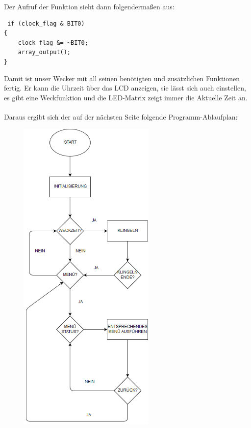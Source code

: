 \documentclass[openright,twoside,11pt,a4paper]{scrartcl}
\begin{document}
\begin{flushleft}
\newpage
Der Aufruf der Funktion sieht dann folgendermaßen aus:
	 	\begin{lstlisting}
 if (clock_flag & BIT0)
{
	clock_flag &= ~BIT0;
	array_output();
}
	 	\end{lstlisting}
	 	Damit ist unser Wecker mit all seinen benötigten und zusätzlichen Funktionen fertig. Er kann die Uhrzeit über das LCD anzeigen, sie lässt sich auch einstellen, es gibt eine Weckfunktion und die LED-Matrix zeigt immer die Aktuelle Zeit an.\\
	 	\ \\
	 	Daraus ergibt sich der auf der nächsten Seite folgende Programm-Ablaufplan:
	 	\begin{figure}[htbp] 
	 		\centering
	 		\includegraphics[width=0.6\textwidth]{Untitled Diagram.png}
	 		\label{fig:Bild1}
	 	\end{figure}

	\end{flushleft}
\end{document}
